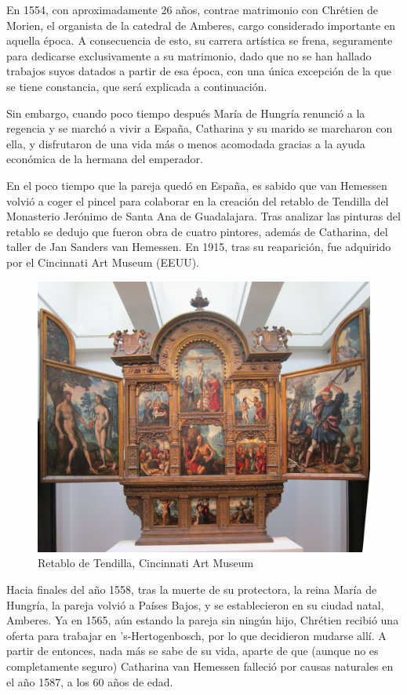 \documentclass[12pt]{book}
\begin{document}
En 1554, con aproximadamente 26 años, contrae matrimonio con Chrétien de Morien, el organista de la catedral de Amberes, cargo considerado importante en aquella época. A consecuencia de esto, su carrera artística se frena, seguramente para dedicarse exclusivamente a su matrimonio, dado que no se han hallado trabajos suyos datados a partir de esa época, con una única excepción de la que se tiene constancia, que será explicada a continuación.\bigskip

Sin embargo, cuando poco tiempo después María de Hungría renunció a la regencia y se marchó a vivir a España, Catharina y su marido se marcharon con ella, y disfrutaron de una vida más o menos acomodada gracias a la ayuda económica de la hermana del emperador.\bigskip

En el poco tiempo que la pareja quedó en España, es sabido que van Hemessen volvió a coger el pincel para colaborar en la creación del retablo de Tendilla del Monasterio Jerónimo de Santa Ana de Guadalajara. Tras analizar las pinturas del retablo se dedujo que fueron obra de cuatro pintores, además de Catharina, del taller de Jan Sanders van Hemessen. En 1915, tras su reaparición, fue adquirido por el Cincinnati Art Museum (EEUU).\bigskip

\begin{figure}[h]
	\centering
	\includegraphics[width=0.75\linewidth]{retablo-de-tendilla}
	\caption{Retablo de Tendilla, Cincinnati Art Museum}
	\label{fig:wrapfig}
\end{figure}

Hacia finales del año 1558, tras la muerte de su protectora, la reina María de Hungría, la pareja volvió a Países Bajos, y se establecieron en su ciudad natal, Amberes. Ya en 1565, aún estando la pareja sin ningún hijo, Chrétien recibió una oferta para trabajar en 's-Hertogenbosch, por lo que decidieron mudarse allí. A partir de entonces, nada más se sabe de su vida, aparte de que (aunque no es completamente seguro) Catharina van Hemessen falleció por causas naturales en el año 1587, a los 60 años de edad.
\end{document}
